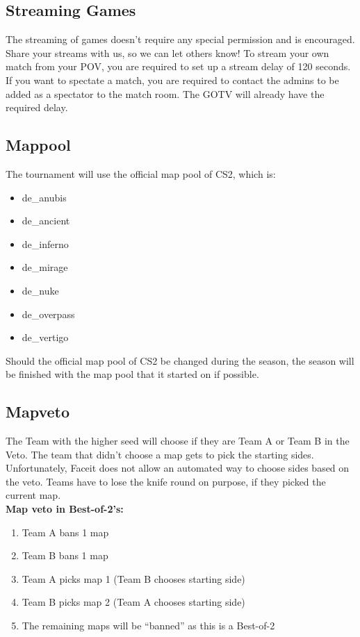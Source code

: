 \documentclass{article}
\newcommand{\TeamA}{{\color{red}Team A }}
\newcommand{\TeamB}{{\color{blue}Team B }}
\begin{document}
\subsection{Streaming Games}
The streaming of games doesn't require any special permission and is encouraged. Share your streams with us, so we can let others know! To stream your own match from your POV, you are required to set up a stream delay of 120 seconds. If you want to spectate a match, you are required to contact the admins to be added as a spectator to the match room. The GOTV will already have the required delay.
\newpage
\subsection{Mappool}
The tournament will use the official map pool of CS2, which is:
\begin{itemize}
    \item de\_anubis
    \item de\_ancient
    \item de\_inferno
    \item de\_mirage
    \item de\_nuke
    \item de\_overpass
    \item de\_vertigo 
\end{itemize}
Should the official map pool of CS2 be changed during the season, the season will be finished with the map pool that it started on if possible.


\subsection{Mapveto}
The Team with the higher seed will choose if they are \TeamA or \TeamB in the Veto. The team that didn't choose a map gets to pick the starting sides. Unfortunately, Faceit does not allow an automated way to choose sides based on the veto. Teams have to lose the knife round on purpose, if they picked the current map.\\

\textbf{Map veto in Best-of-2's:}
\begin{enumerate}
    \item \TeamA bans 1 map
    \item \TeamB bans 1 map
    \item \TeamA picks map 1 (\TeamB chooses starting side)
    \item \TeamB picks map 2 (\TeamA chooses starting side)
    \item The remaining maps will be “banned” as this is a Best-of-2
\end{enumerate}
\end{document}
